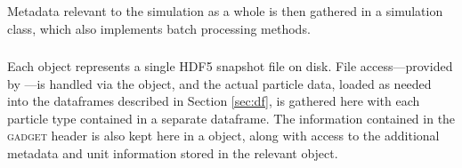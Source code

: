 \subsubsection{}
\label{sec:sim}
Metadata relevant to the simulation as a whole is then gathered in a simulation class, which also implements batch processing methods.

\subsubsection{}
\label{sec:snap}
Each  object represents a single HDF5 snapshot file on disk.  File access---provided by ---is handled via the  object, and the actual particle data, loaded as needed into the  dataframes described in Section \ref{sec:df}, is gathered here with each particle type contained in a separate  dataframe.  
The information contained in the \textsc{gadget} header is also kept here in a  object, along with access to the additional metadata and unit information stored in the relevant  object.

